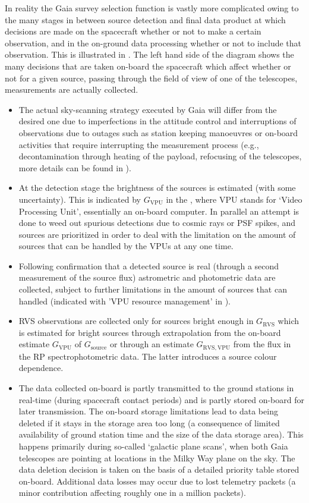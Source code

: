 In reality the Gaia survey selection function is vastly more complicated owing to the many stages in between source detection and final data product at which decisions are made on the spacecraft whether or not to make a certain observation, and in the on-ground data processing whether or not to include that observation. This is illustrated in . The left hand side of the diagram shows the many decisions that are taken on-board the spacecraft which affect whether or not for a given source, passing through the field of view of one of the telescopes, measurements are actually collected.
\begin{itemize}
    \item The actual sky-scanning strategy executed by Gaia will differ from the desired one due to imperfections in the attitude control and interruptions of observations due to outages such as station keeping manoeuvres or on-board activities that require interrupting the measurement process (e.g., decontamination through heating of the payload, refocusing of the telescopes, more details can be found in \cite{2016A&A...595A...1G}).
    \item At the detection stage the brightness of the sources is estimated (with some uncertainty). This is indicated by $G_\mathrm{VPU}$ in the , where VPU stands for `Video Processing Unit', essentially an on-board computer. In parallel an attempt is done to weed out spurious detections due to cosmic rays or PSF spikes, and sources are prioritized in order to deal with the limitation on the amount of sources that can be handled by the VPUs at any one time.
    \item Following confirmation that a detected source is real (through a second measurement of the source flux) astrometric and photometric data are collected, subject to further limitations in the amount of sources that can handled (indicated with 'VPU resource management' in ).
    \item RVS observations are collected only for sources bright enough in $G_\mathrm{RVS}$ which is estimated for bright sources through extrapolation from the on-board estimate $G_\mathrm{VPU}$ of $G_\mathrm{source}$ or through an estimate $G_\mathrm{RVS,VPU}$ from the flux in the RP spectrophotometric data. The latter introduces a source colour dependence.
    \item The data collected on-board is partly transmitted to the ground stations in real-time (during spacecraft contact periods) and is partly stored on-board for later transmission. The on-board storage limitations lead to data being deleted if it stays in the storage area too long (a consequence of limited availability of ground station time and the size of the data storage area). This happens primarily during so-called `galactic plane scans', when both Gaia telescopes are pointing at locations in the Milky Way plane on the sky. The data deletion decision is taken on the basis of a detailed priority table stored on-board. Additional data losses may occur due to lost telemetry packets (a minor contribution affecting roughly one in a million packets).
\end{itemize}

